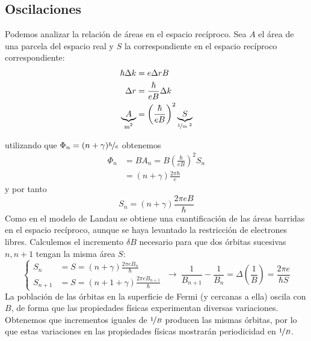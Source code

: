 \subsection{Oscilaciones}
Podemos analizar la relación de áreas en el espacio recíproco. Sea $A$
el área de una parcela del espacio real y $S$ la correspondiente en el
espacio recíproco correspondiente:
\begin{equation}
  \begin{split}
    \hbar \Delta k &= e \Delta r B \\
    \Delta r &= \frac{\hbar}{eB} \Delta k \\
    \underbrace{A}_{\text{m\textsuperscript 2}} &= \left(
      \frac{\hbar}{eB} \right)^2 \underbrace{S}_{\nicefrac{1}{\text{m
          \textsuperscript 2}}} \\
  \end{split}
\end{equation}

utilizando que $\Phi_n = (n+\gamma)  \nicefrac{h}{e}$ obtenemos
\begin{equation}
  \begin{split}
    \Phi_n &= B A_n = B \left( \frac{\hbar}{eB} \right)^2 S_n \\
     &= (n+\gamma) \frac{2\pi \hbar}{e}
  \end{split}
\end{equation}
y por tanto
\begin{equation}
  S_n = (n+\gamma) \frac{2\pi e B}{\hbar}
\end{equation}
Como en el modelo de Landau se obtiene una cuantificación de las áreas
barridas en el espacio recíproco, aunque se haya levantado la
restricción de electrones libres. Calculemos el incremento $\delta B$
necesario para que dos órbitas sucesivas $n,n+1$ tengan la misma área
$S$:
\begin{equation}
  \begin{cases}
    S_n &= S = (n+\gamma)\frac{2\pi e B_n}{\hbar} \\
    S_{n+1} &= S = (n+1+\gamma)\frac{2\pi e B_{n+1}}{\hbar}
  \end{cases} \ \rightarrow \ \frac{1}{B_{n+1}} - \frac{1}{B_n} =
  \Delta \left( \frac{1}{B} \right) = \frac{2\pi e}{\hbar S}
\end{equation}
La población de las órbitas en la superficie de Fermi
(y cercanas a ella) oscila con $B$, de forma que las propiedades
físicas experimentan diversas variaciones. Obtenemos que incrementos iguales de $\nicefrac{1}{B}$ producen las
mismas órbitas, por lo que estas variaciones en las propiedades
físicas mostrarán periodicidad en $\nicefrac{1}{B}$.

